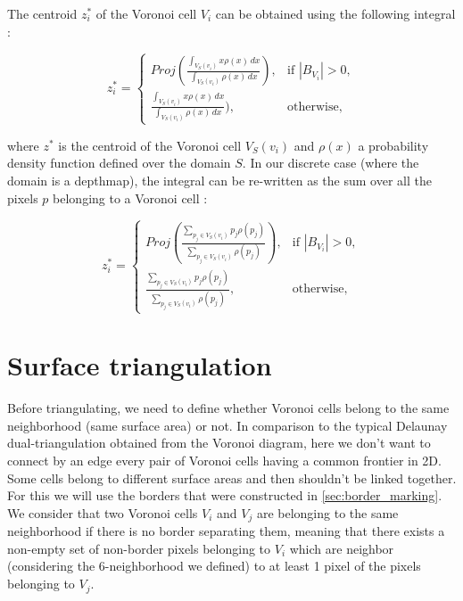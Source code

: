 \documentclass[11pt,fleqn]{book} %
\begin{document}
The centroid $z_i^*$ of the Voronoi cell $V_i$ can be obtained using the following integral :

\begin{equation}
		z_i^* = \begin{cases}
		Proj(\frac{\int_{V_S(v_i)} x\rho(x)\,dx}{\int_{V_S(v_i)} \rho(x)\,dx}) , & \text{if $|B_{V_i}| > 0$}, \\
		\frac{\int_{V_S(v_i)} x\rho(x)\,dx}{\int_{V_S(v_i)} \rho(x)\,dx}), & \text{otherwise}, 
		\end{cases}
\end{equation}

where $z^*$ is the centroid of the Voronoi cell $V_S(v_i)$ and $\rho(x)$ a probability density function defined over the domain $S$.
In our discrete case (where the domain is a depthmap), the integral can be re-written as the sum over all the pixels $p$ belonging to a Voronoi cell : 

\begin{equation}
		z_i^* = \begin{cases}
		Proj(\frac{\sum_{p_j \in V_S(v_i)} p_j\rho(p_j)}{\sum_{p_j \in V_S(v_i)} \rho(p_j)}) , & \text{if $|B_{V_i}| > 0$}, \\
		\frac{\sum_{p_j \in V_S(v_i)} p_j\rho(p_j)}{\sum_{p_j \in V_S(v_i)} \rho(p_j)}, & \text{otherwise}, 
		\end{cases}
\end{equation}

\section{Surface triangulation}
\label{sec:surface_triangulation}
Before triangulating, we need to define whether Voronoi cells belong to the same neighborhood (same surface area) or not. In comparison to the typical Delaunay dual-triangulation obtained from the Voronoi diagram, here we don't want to connect by an edge every pair of Voronoi cells having a common frontier in 2D. Some cells belong to different surface areas and then shouldn't be linked together.
For this we will use the borders that were constructed in \ref{sec:border_marking}.
We consider that two Voronoi cells $V_i$ and $V_j$ are belonging to the same neighborhood if there is no border separating them, meaning that there exists a non-empty set of non-border pixels belonging to $V_i$ which are neighbor (considering the 6-neighborhood we defined) to at least 1 pixel of the pixels belonging to $V_j$.
\end{document}
